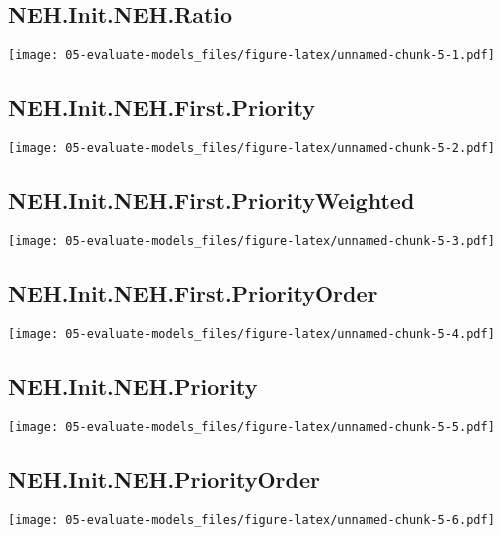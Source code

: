 \documentclass[
]{article}
\begin{document}
\hypertarget{neh.init.neh.ratio}{%
\subsection{NEH.Init.NEH.Ratio}\label{neh.init.neh.ratio}}

\texttt{[image: 05-evaluate-models\_files/figure-latex/unnamed-chunk-5-1.pdf]}

\hypertarget{neh.init.neh.first.priority}{%
\subsection{NEH.Init.NEH.First.Priority}\label{neh.init.neh.first.priority}}

\texttt{[image: 05-evaluate-models\_files/figure-latex/unnamed-chunk-5-2.pdf]}

\hypertarget{neh.init.neh.first.priorityweighted}{%
\subsection{NEH.Init.NEH.First.PriorityWeighted}\label{neh.init.neh.first.priorityweighted}}

\texttt{[image: 05-evaluate-models\_files/figure-latex/unnamed-chunk-5-3.pdf]}

\hypertarget{neh.init.neh.first.priorityorder}{%
\subsection{NEH.Init.NEH.First.PriorityOrder}\label{neh.init.neh.first.priorityorder}}

\texttt{[image: 05-evaluate-models\_files/figure-latex/unnamed-chunk-5-4.pdf]}

\hypertarget{neh.init.neh.priority}{%
\subsection{NEH.Init.NEH.Priority}\label{neh.init.neh.priority}}

\texttt{[image: 05-evaluate-models\_files/figure-latex/unnamed-chunk-5-5.pdf]}

\hypertarget{neh.init.neh.priorityorder}{%
\subsection{NEH.Init.NEH.PriorityOrder}\label{neh.init.neh.priorityorder}}

\texttt{[image: 05-evaluate-models\_files/figure-latex/unnamed-chunk-5-6.pdf]}
\end{document}
